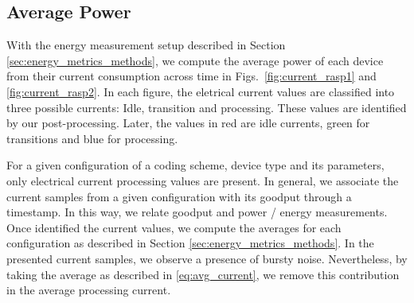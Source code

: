 \subsection{Average Power}
With the energy measurement setup described in Section
\ref{sec:energy_metrics_methods}, we compute the average power of each
device from their current consumption across time in
Figs.~\ref{fig:current_rasp1} and \ref{fig:current_rasp2}. In each
figure, the eletrical current values are classified into three possible
currents: Idle, transition and processing. These values are identified by
our post-processing. Later, the values in red are idle currents, green for
transitions and blue for processing.

For a given configuration of a coding scheme, device type and its parameters,
only electrical current processing values are present. In general, we
associate the current samples from a given configuration with its goodput
through a timestamp. In this way, we relate goodput and power / energy
measurements. Once identified the current values, we compute the averages
for each configuration as described in Section
\ref{sec:energy_metrics_methods}. In the presented current samples, we observe
a presence of bursty noise. Nevertheless, by taking the average as described
in \eqref{eq:avg_current}, we remove this contribution in the average
processing current.
%

